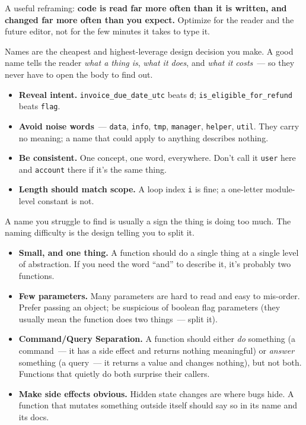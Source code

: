 \noindent{}A useful reframing: \textbf{code is read far more often than it is written, and changed far more often
than you expect.} Optimize for the reader and the future editor, not for the few minutes it takes
to type it.

\label{writing-good-code:naming}

Names are the cheapest and highest-leverage design decision you make. A good name tells the reader
\emph{what a thing is}, \emph{what it does}, and \emph{what it costs}~--- so they never have to open the body to find
out.

\begin{itemize}
\tightlist
\item
  \textbf{Reveal intent.} \texttt{invoice\_due\_date\_utc} beats \texttt{d}; \texttt{is\_eligible\_for\_refund} beats \texttt{flag}.
\item
  \textbf{Avoid noise words}~--- \texttt{data}, \texttt{info}, \texttt{tmp}, \texttt{manager}, \texttt{helper}, \texttt{util}. They carry no meaning;
  a name that could apply to anything describes nothing.
\item
  \textbf{Be consistent.} One concept, one word, everywhere. Don't call it \texttt{user} here and \texttt{account}
  there if it's the same thing.
\item
  \textbf{Length should match scope.} A loop index \texttt{i} is fine; a one-letter module-level constant is not.
\end{itemize}

\noindent{}A name you struggle to find is usually a sign the thing is doing too much. The naming difficulty is
the design telling you to split it.

\label{writing-good-code:functions}

\begin{itemize}
\tightlist
\item
  \textbf{Small, and one thing.} A function should do a single thing at a single level of abstraction. If
  you need the word ``and'' to describe it, it's probably two functions.
\item
  \textbf{Few parameters.} Many parameters are hard to read and easy to mis-order. Prefer passing an
  object; be suspicious of boolean flag parameters (they usually mean the function does two things~---
  split it).
\item
  \textbf{Command/Query Separation.} A function should either \emph{do} something (a command~--- it has a side
  effect and returns nothing meaningful) or \emph{answer} something (a query~--- it returns a value and
  changes nothing), but not both. Functions that quietly do both surprise their callers.
\item
  \textbf{Make side effects obvious.} Hidden state changes are where bugs hide. A function that mutates
  something outside itself should say so in its name and its docs.
\end{itemize}

